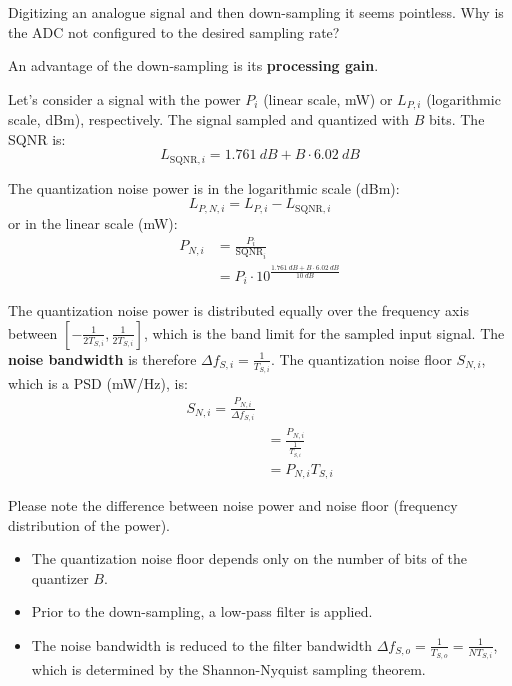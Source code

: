 \begin{refsection}
Digitizing an analogue signal and then down-sampling it seems pointless. Why is the \ac{ADC} not configured to the desired sampling rate?

An advantage of the down-sampling is its  \textbf{processing gain}.

Let's consider a signal with the power $P_i$ (linear scale, \si{mW}) or $L_{P,i}$ (logarithmic scale, \si{dBm}), respectively. The signal sampled and quantized with $B$ bits. The \ac{SQNR} is:
\begin{equation}
	L_{\mathrm{SQNR},i} = \SI{1.761}{dB} + B \cdot \SI{6.02}{dB}
\end{equation}

The quantization noise power is in the logarithmic scale (\si{dBm}):
\begin{equation}
	L_{P,N,i} = L_{P,i} - L_{\mathrm{SQNR},i}
\end{equation}
or in the linear scale (\si{mW}):
\begin{equation}
	\begin{split}
		P_{N,i} &= \frac{P_i}{\mathrm{SQNR}_i} \\
		 &= P_i \cdot 10^{\frac{\SI{1.761}{dB} + B \cdot \SI{6.02}{dB}}{\SI{10}{dB}}}
	\end{split}
\end{equation}

The quantization noise power is distributed equally over the frequency axis between $[-\frac{1}{2 T_{S,i}}, \frac{1}{2 T_{S,i}}]$, which is the band limit for the sampled input signal. The  \textbf{noise bandwidth} is therefore $\Delta f_{S,i} = \frac{1}{T_{S,i}}$. The quantization noise floor $S_{N,i}$, which is a \ac{PSD} (\si{mW/Hz}), is:
\begin{equation}
	\begin{split}
		S_{N,i} = \frac{P_{N,i}}{\Delta f_{S,i}} \\
		 &= \frac{P_{N,i}}{\frac{1}{T_{S,i}}} \\
		 &= P_{N,i} T_{S,i}
	\end{split}
\end{equation}

\begin{attention}
	Please note the difference between noise power and noise floor (frequency distribution of the power).
\end{attention}

\begin{itemize}
	\item The quantization noise floor depends only on the number of bits of the quantizer $B$.
	\item Prior to the down-sampling, a low-pass filter is applied.
	\item The noise bandwidth is reduced to the filter bandwidth $\Delta f_{S,o} = \frac{1}{T_{S,o}} = \frac{1}{N T_{S,i}}$, which is determined by the Shannon-Nyquist sampling theorem.
\end{itemize}


\end{refsection}
